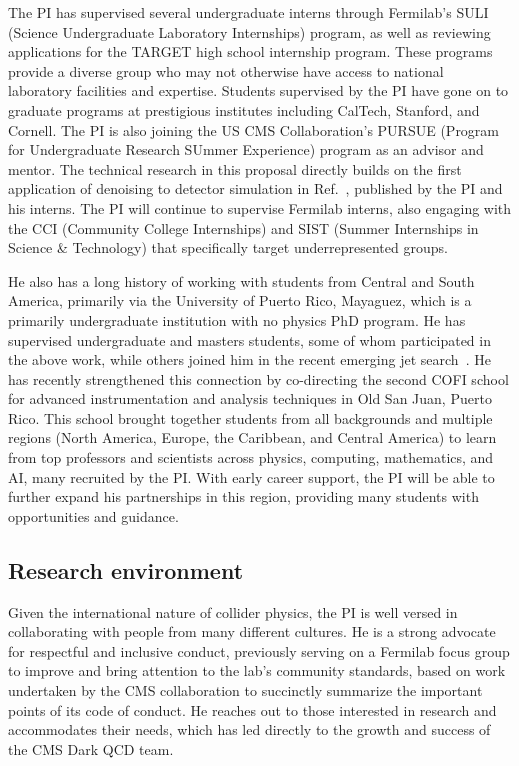 The PI has supervised several undergraduate interns through Fermilab's SULI (Science Undergraduate Laboratory Internships) program,
as well as reviewing applications for the TARGET high school internship program.
These programs provide a diverse group who may not otherwise have access to national laboratory facilities and expertise.
Students supervised by the PI have gone on to graduate programs at prestigious institutes including CalTech, Stanford, and Cornell.
The PI is also joining the US CMS Collaboration's PURSUE (Program for Undergraduate Research SUmmer Experience) program as an advisor and mentor.
The technical research in this proposal directly builds on the first application of denoising to detector simulation in Ref.~\cite{Banerjee:2022gkg},
published by the PI and his interns.
The PI will continue to supervise Fermilab interns, also engaging with the CCI (Community College Internships) and SIST (Summer Internships in Science \& Technology)
that specifically target underrepresented groups.

He also has a long history of working with students from Central and South America,
primarily via the University of Puerto Rico, Mayaguez, which is a primarily undergraduate institution with no physics PhD program.
He has supervised undergraduate and masters students, some of whom participated in the above work,
while others joined him in the recent emerging jet search~\cite{CMS:2024gxp}.
He has recently strengthened this connection by co-directing
the second COFI school for advanced instrumentation and analysis techniques in Old San Juan, Puerto Rico.
This school brought together students from all backgrounds and multiple regions (North America, Europe, the Caribbean, and Central America)
to learn from top professors and scientists across physics, computing, mathematics, and AI, many recruited by the PI.
With early career support, the PI will be able to further expand his partnerships in this region,
providing many students with opportunities and guidance.

\subsection{Research environment}

Given the international nature of collider physics,
the PI is well versed in collaborating with people from many different cultures.
He is a strong advocate for respectful and inclusive conduct,
previously serving on a Fermilab focus group to improve and bring attention to the lab's community standards,
based on work undertaken by the CMS collaboration to succinctly summarize the important points of its code of conduct.
He reaches out to those interested in research and accommodates their needs,
which has led directly to the growth and success of the CMS Dark QCD team.

